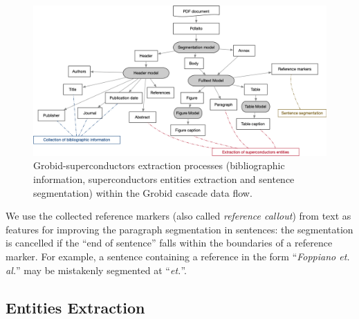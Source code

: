 \documentclass{article}
\begin{document}
\begin{figure}[ht]
\includegraphics[width=\textwidth]{grobid-extraction-2}
\caption{Grobid-superconductors extraction processes (bibliographic information, superconductors entities extraction and sentence segmentation) within the Grobid cascade data flow.}
\label{fig:grobid-document-processing}
\end{figure}

We use the collected reference markers (also called \textit{reference callout}) from text as features for improving the paragraph segmentation in sentences: the segmentation is cancelled if the ``end of sentence'' falls within the boundaries of a reference marker. 
For example, a sentence containing a reference in the form ``\textit{Foppiano et. al.}'' may be mistakenly segmented at ``\textit{et.}''.



\subsection{Entities Extraction}
\label{subsubsec:extraction}
\end{document}
